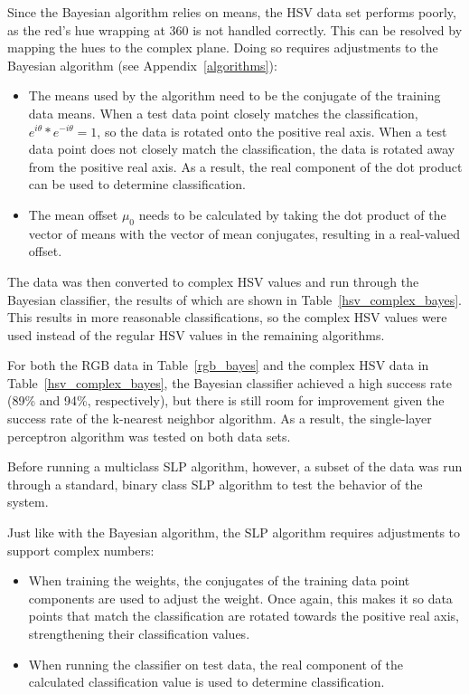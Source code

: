 \documentclass[twoside]{IEEEtran}
\begin{document}
Since the Bayesian algorithm relies on means, the HSV data set performs poorly, as the red's hue
wrapping at 360 is not handled correctly. This can be resolved by mapping the hues to the
complex plane. Doing so requires adjustments to the Bayesian algorithm (see Appendix~\ref{algorithms}):
\begin{itemize}
    \item The means used by the algorithm need to be the conjugate of the training data means.
          When a test data point closely matches the classification, \( e^{i\theta} * e^{-i\theta} = 1 \),
          so the data is rotated onto the positive real axis. When a test data point does not closely
          match the classification, the data is rotated away from the positive real axis. As a result,
          the real component of the dot product can be used to determine classification.

    \item The mean offset \( \mu_0 \) needs to be calculated by taking the dot product of the vector of means
          with the vector of mean conjugates, resulting in a real-valued offset.
\end{itemize}

The data was then converted to complex HSV values and run through the Bayesian classifier, the
results of which are shown in Table~\ref{hsv_complex_bayes}. This results in more reasonable classifications, so the
complex HSV values were used instead of the regular HSV values in the remaining algorithms.

For both the RGB data in Table~\ref{rgb_bayes} and the complex HSV data in Table~\ref{hsv_complex_bayes}, the Bayesian
classifier achieved a high success rate (89\% and 94\%, respectively), but there is still room for
improvement given the success rate of the k-nearest neighbor algorithm. As a result, the single-layer
perceptron algorithm was tested on both data sets.

Before running a multiclass SLP algorithm, however, a subset of the data was run through a standard, binary class SLP algorithm to test the behavior of
the system.

Just like with the Bayesian algorithm, the SLP algorithm requires adjustments to support
complex numbers:

\begin{itemize}
    \item When training the weights, the conjugates of the training data point components are used
          to adjust the weight. Once again, this makes it so data points that match the classification
          are rotated towards the positive real axis, strengthening their classification values.

    \item When running the classifier on test data, the real component of the calculated
          classification value is used to determine classification.
\end{itemize}
\end{document}
